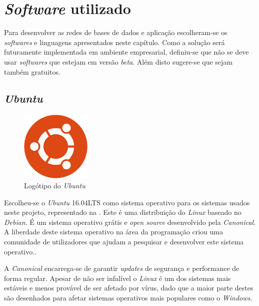 \documentclass[11pt,twoside,a4paper]{report}
\begin{document}

\section{\textit{Software} utilizado}
Para desenvolver as redes de bases de dados e aplicação escolheram-se os \textit{softwares} e linguagens apresentados neste capítulo. Como a solução será futuramente implementada em ambiente empresarial, definiu-se que não se deve usar \textit{softwares} que estejam em versão \textit{beta}. Além disto sugere-se que sejam também gratuitos.

\subsection{\textit{Ubuntu}}
\begin{figure}[H]
	\begin{center}
		\includegraphics[width=0.3\textwidth]{ubuntu} %
		\caption{Logótipo do \textit{Ubuntu}}
		\label{fig:linux}
	\end{center}
\end{figure}
Escolheu-se o \textit{Ubuntu} 16.04LTS como sistema operativo para os sistemas usados neste projeto, representado na . Este é uma distribuição do \textit{Linux} baseado no \textit{Debian}. É um sistema operativo grátis e \textit{open source} desenvolvido pela \textit{Canonical}. A liberdade deste sistema operativo na área da programação criou uma comunidade de utilizadores que ajudam a pesquisar e desenvolver este sistema operativo.\cite{ubuntu}.\par 
A \textit{Canonical} encarrega-se de garantir \textit{updates} de segurança e performance de forma regular. Apesar de não ser infalível o \textit{Linux} é um dos sistemas mais estáveis e menos provável de ser afetado por vírus, dado que a maior parte destes são desenhados para afetar sistemas operativos mais populares como o \textit{Windows}.
\end{document}
